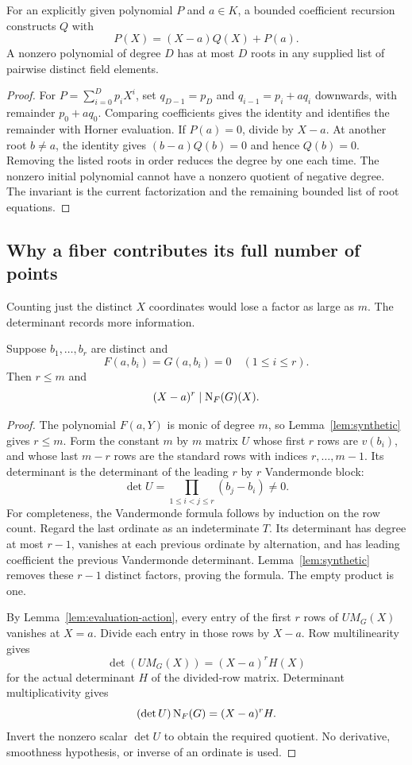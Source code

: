 \begin{lemma}\label{lem:synthetic}
For an explicitly given polynomial $P$ and $a\in K$, a bounded coefficient recursion constructs $Q$ with
\[
 P(X)=(X-a)Q(X)+P(a).
\]
A nonzero polynomial of degree $D$ has at most $D$ roots in any supplied list of pairwise distinct field elements.
\end{lemma}
\begin{proof}
For $P=\sum_{i=0}^{D}p_iX^i$, set $q_{D-1}=p_D$ and $q_{i-1}=p_i+aq_i$ downwards, with remainder $p_0+aq_0$. Comparing coefficients gives the identity and identifies the remainder with Horner evaluation. If $P(a)=0$, divide by $X-a$. At another root $b\ne a$, the identity gives $(b-a)Q(b)=0$ and hence $Q(b)=0$. Removing the listed roots in order reduces the degree by one each time. The nonzero initial polynomial cannot have a nonzero quotient of negative degree. The invariant is the current factorization and the remaining bounded list of root equations.
\end{proof}

\subsection{Why a fiber contributes its full number of points}

Counting just the distinct $X$ coordinates would lose a factor as large as $m$. The determinant records more information.

\begin{lemma}\label{lem:fiber}
Suppose $b_1,\ldots,b_r$ are distinct and
\[
 F(a,b_i)=G(a,b_i)=0\quad(1\le i\le r).
\]
Then $r\le m$ and
\[
 (X-a)^r\mid\operatorname{N}_F(G)(X).
\]
\end{lemma}
\begin{proof}
The polynomial $F(a,Y)$ is monic of degree $m$, so Lemma~\ref{lem:synthetic} gives $r\le m$. Form the constant $m$ by $m$ matrix $U$ whose first $r$ rows are $v(b_i)$, and whose last $m-r$ rows are the standard rows with indices $r,\ldots,m-1$. Its determinant is the determinant of the leading $r$ by $r$ Vandermonde block:
\[
 \det U=\prod_{1\le i<j\le r}(b_j-b_i)\ne0.
\]
For completeness, the Vandermonde formula follows by induction on the row count. Regard the last ordinate as an indeterminate $T$. Its determinant has degree at most $r-1$, vanishes at each previous ordinate by alternation, and has leading coefficient the previous Vandermonde determinant. Lemma~\ref{lem:synthetic} removes these $r-1$ distinct factors, proving the formula. The empty product is one.

By Lemma~\ref{lem:evaluation-action}, every entry of the first $r$ rows of $UM_G(X)$ vanishes at $X=a$. Divide each entry in those rows by $X-a$. Row multilinearity gives
\[
 \det(UM_G(X))=(X-a)^r H(X)
\]
for the actual determinant $H$ of the divided-row matrix. Determinant multiplicativity gives
\[
 (\det U)\operatorname{N}_F(G)=(X-a)^rH.
\]
Invert the nonzero scalar $\det U$ to obtain the required quotient. No derivative, smoothness hypothesis, or inverse of an ordinate is used.
\end{proof}

